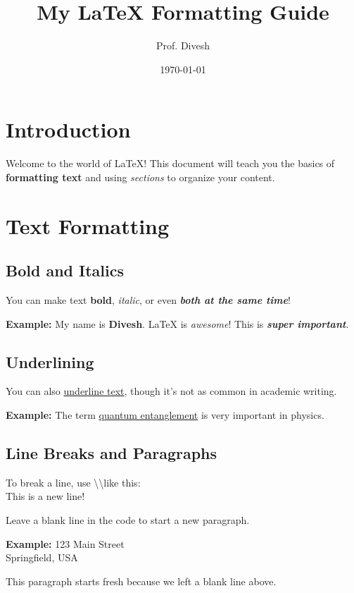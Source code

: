 \documentclass{article}
\title{My LaTeX Formatting Guide}
\author{Prof. Divesh}
\date{\today}
\begin{document}
\maketitle

\section{Introduction}
Welcome to the world of \LaTeX! This document will teach you the basics of \textbf{formatting text} and using \textit{sections} to organize your content.

\section{Text Formatting}

\subsection{Bold and Italics}
You can make text \textbf{bold}, \textit{italic}, or even \textbf{\textit{both at the same time}}!

\textbf{Example:}  
My name is \textbf{Divesh}.  
LaTeX is \textit{awesome}!  
This is \textbf{\textit{super important}}.

\subsection{Underlining}
You can also \underline{underline text}, though it’s not as common in academic writing.

\textbf{Example:}  
The term \underline{quantum entanglement} is very important in physics.

\subsection{Line Breaks and Paragraphs}
To break a line, use \textbackslash\textbackslash like this:\\
This is a new line!

Leave a blank line in the code to start a new paragraph.

\textbf{Example:}  
123 Main Street\\
Springfield, USA

This paragraph starts fresh because we left a blank line above.
\end{document}
